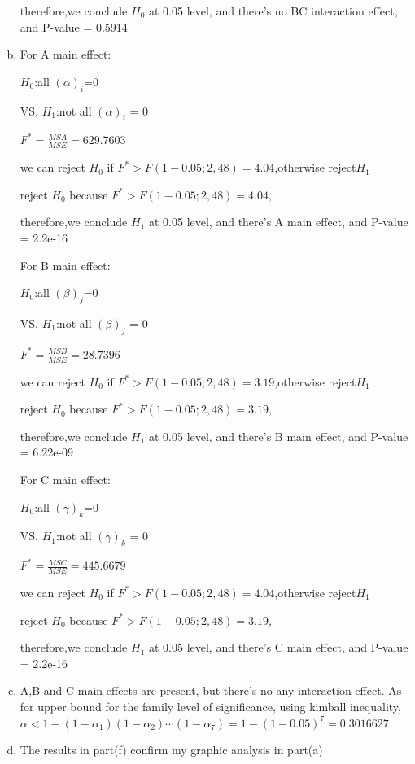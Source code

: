 \documentclass{article}\usepackage[]{graphicx}\usepackage[]{color}
\begin{document}
\begin{enumerate}[(a)]
\begin{center}
therefore,we conclude $H_0$ at 0.05 level, and there's no BC interaction effect, and P-value = 0.5914
\end{center}

\item

For A main effect:

\begin{center}
$H_0$:all $(\alpha)_{i}$=0

VS. $H_1$:not all $(\alpha)_{i}$ = 0

$F^*=\frac{MSA}{MSE} = 629.7603$

we can reject $H_0$ if $F^* > F(1-0.05;2,48)=4.04$,otherwise reject$H_1$

reject $H_0$ because $F^*>F(1-0.05;2,48)=4.04$,

therefore,we conclude $H_1$ at 0.05 level, and there's A main effect, and P-value = 2.2e-16
\end{center}

For B main effect:

\begin{center}
$H_0$:all $(\beta)_{j}$=0

VS. $H_1$:not all $(\beta)_{j}$ = 0

$F^*=\frac{MSB}{MSE} = 28.7396$

we can reject $H_0$ if $F^* > F(1-0.05;2,48)=3.19$,otherwise reject$H_1$

reject $H_0$ because $F^*>F(1-0.05;2,48)=3.19$,

therefore,we conclude $H_1$ at 0.05 level, and there's B main effect, and P-value = 6.22e-09
\end{center}

For C main effect:

\begin{center}
$H_0$:all $(\gamma)_{k}$=0

VS. $H_1$:not all $(\gamma)_{k}$ = 0

$F^*=\frac{MSC}{MSE} = 445.6679$

we can reject $H_0$ if $F^* > F(1-0.05;2,48)=4.04$,otherwise reject$H_1$

reject $H_0$ because $F^*>F(1-0.05;2,48)=3.19$,

therefore,we conclude $H_1$ at 0.05 level, and there's C main effect, and P-value = 2.2e-16
\end{center}

\item

\qquad A,B and C main effects are present, but there's no any interaction effect. As for upper bound for the family level of significance, using kimball inequality,$\alpha < 1-(1-\alpha_1)(1-\alpha_2) \cdots (1-\alpha_7)=1-(1-0.05)^7=0.3016627$

\item 

\qquad The results in part(f) confirm my graphic analysis in part(a)

\end{enumerate}
\end{document}
